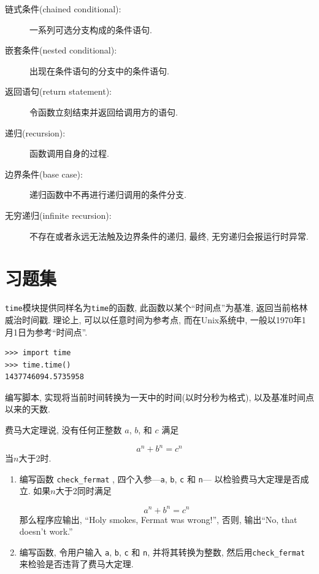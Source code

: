 \documentclass[10pt]{book}
\begin{document}
\begin{description}
\item[链式条件(chained conditional):] 一系列可选分支构成的条件语句. 

\item[嵌套条件(nested conditional):]  出现在条件语句的分支中的条件语句. 

\item[返回语句(return statement):] 令函数立刻结束并返回给调用方的语句. 

\item[递归(recursion):]  函数调用自身的过程. 

\item[边界条件(base case):]  递归函数中不再进行递归调用的条件分支. 

\item[无穷递归(infinite recursion):]  不存在或者永远无法触及边界条件的递归, 最终, 无穷递归会报运行时异常.

\end{description}

\section{习题集}

\begin{exercise}

{\tt time}模块提供同样名为{\tt time}的函数, 此函数以某个``时间点''为基准, 
返回当前格林威治时间戳. 理论上, 可以以任意时间为参考点, 而在Unix系统中, 
一般以1970年1月1日为参考``时间点''. 

\begin{verbatim}
>>> import time
>>> time.time()
1437746094.5735958
\end{verbatim}

编写脚本, 实现将当前时间转换为一天中的时间(以时分秒为格式), 
以及基准时间点以来的天数. 

\end{exercise}


\begin{exercise}

费马大定理说, 没有任何正整数
$a$, $b$, 和 $c$ 满足

\[ a^n + b^n = c^n \]
%
当$n$大于2时.

\begin{enumerate}

\item 编写函数 \verb"check_fermat" , 四个入参---{\tt a}, {\tt b}, {\tt c} 和 {\tt n}---
以检验费马大定理是否成立. 
如果$n$大于2同时满足

\[a^n + b^n = c^n \]
%
那么程序应输出,  ``Holy smokes, Fermat was wrong!'', 
否则, 输出``No, that doesn't work.''

\item 编写函数, 令用户输入 {\tt a}, {\tt b}, {\tt c} 和 {\tt n}, 
并将其转换为整数, 然后用\verb"check_fermat" 来检验是否违背了费马大定理. 

\end{enumerate}

\end{exercise}
\end{document}
